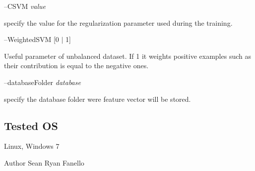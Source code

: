 --C\+S\+VM {\itshape value} 
\begin{DoxyItemize}
\item specify the value for the regularization parameter used during the training.
\end{DoxyItemize}

--Weighted\+S\+VM {\itshape }\mbox{[}0 $\vert$ 1\mbox{]}
\begin{DoxyItemize}
\item Useful parameter of unbalanced dataset. If 1 it weights positive examples such as their contribution is equal to the negative ones.
\end{DoxyItemize}

--database\+Folder {\itshape database} 
\begin{DoxyItemize}
\item specify the database folder were feature vector will be stored.
\end{DoxyItemize}\hypertarget{group__icub__sparseCoder_tested_os_sec}{}\subsection{Tested OS}\label{group__icub__sparseCoder_tested_os_sec}
Linux, Windows 7

\begin{DoxyAuthor}{Author}
Sean Ryan Fanello 
\end{DoxyAuthor}
